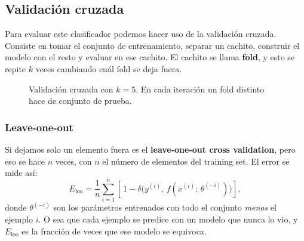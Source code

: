 \documentclass[11pt,letterpaper]{article}
\begin{document}
\subsection*{Validación cruzada}

Para evaluar este clasificador podemos hacer uso de la validación
cruzada. Consiste en tomar el conjunto de entrenamiento, separar un
cachito, construir el modelo con el resto y evaluar en ese cachito.
El cachito se llama \textbf{fold}, y esto se repite $k$ veces
cambiando cuál fold se deja fuera.

\begin{figure}[htbp]
  \centering
  \caption{Validación cruzada con $k = 5$. En cada iteración un fold
    distinto hace de conjunto de prueba.}
  \label{fig:kfolds}
\end{figure}

\subsubsection*{Leave-one-out}

Si dejamos solo un elemento fuera es el \textbf{leave-one-out cross
validation}, pero eso se hace $n$ veces, con $n$ el número de
elementos del training set. El error se mide así:
\[
    E_{\mathrm{loo}} = \frac{1}{n} \sum_{i=1}^{n}
    \left[\, 1 - \delta\big(y^{(i)},\,
    f(x^{(i)};\, \theta^{(-i)})\big) \right] ,
\]
donde $\theta^{(-i)}$ son los parámetros entrenados con todo el
conjunto \emph{menos} el ejemplo $i$. O sea que cada ejemplo se
predice con un modelo que nunca lo vio, y $E_{\mathrm{loo}}$ es la
fracción de veces que ese modelo se equivoca.
\end{document}
